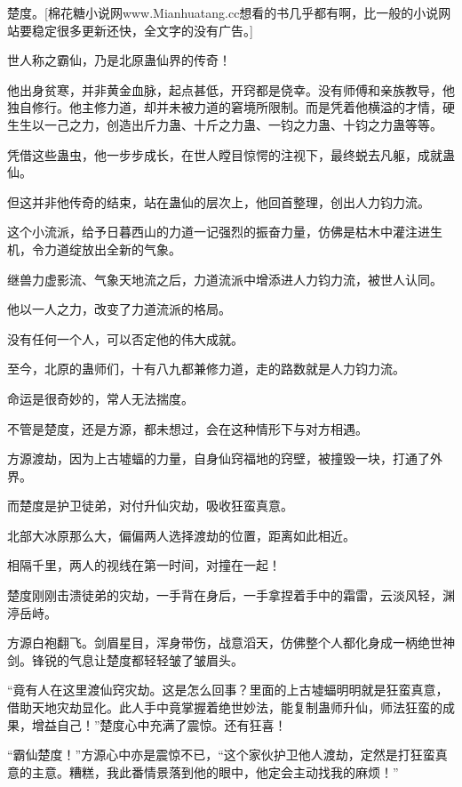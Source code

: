 
\begin{this_body}

楚度。[棉花糖小说网www.Mianhuatang.cc想看的书几乎都有啊，比一般的小说网站要稳定很多更新还快，全文字的没有广告。]

世人称之霸仙，乃是北原蛊仙界的传奇！

他出身贫寒，并非黄金血脉，起点甚低，开窍都是侥幸。没有师傅和亲族教导，他独自修行。他主修力道，却并未被力道的窘境所限制。而是凭着他横溢的才情，硬生生以一己之力，创造出斤力蛊、十斤之力蛊、一钧之力蛊、十钧之力蛊等等。

凭借这些蛊虫，他一步步成长，在世人瞠目惊愕的注视下，最终蜕去凡躯，成就蛊仙。

但这并非他传奇的结束，站在蛊仙的层次上，他回首整理，创出人力钧力流。

这个小流派，给予日暮西山的力道一记强烈的振奋力量，仿佛是枯木中灌注进生机，令力道绽放出全新的气象。

继兽力虚影流、气象天地流之后，力道流派中增添进人力钧力流，被世人认同。

他以一人之力，改变了力道流派的格局。

没有任何一个人，可以否定他的伟大成就。

至今，北原的蛊师们，十有八九都兼修力道，走的路数就是人力钧力流。

命运是很奇妙的，常人无法揣度。

不管是楚度，还是方源，都未想过，会在这种情形下与对方相遇。

方源渡劫，因为上古墟蝠的力量，自身仙窍福地的窍壁，被撞毁一块，打通了外界。

而楚度是护卫徒弟，对付升仙灾劫，吸收狂蛮真意。

北部大冰原那么大，偏偏两人选择渡劫的位置，距离如此相近。

相隔千里，两人的视线在第一时间，对撞在一起！

楚度刚刚击溃徒弟的灾劫，一手背在身后，一手拿捏着手中的霜雷，云淡风轻，渊渟岳峙。

方源白袍翻飞。剑眉星目，浑身带伤，战意滔天，仿佛整个人都化身成一柄绝世神剑。锋锐的气息让楚度都轻轻皱了皱眉头。

“竟有人在这里渡仙窍灾劫。这是怎么回事？里面的上古墟蝠明明就是狂蛮真意，借助天地灾劫显化。此人手中竟掌握着绝世妙法，能复制蛊师升仙，师法狂蛮的成果，增益自己！”楚度心中充满了震惊。还有狂喜！

“霸仙楚度！”方源心中亦是震惊不已，“这个家伙护卫他人渡劫，定然是打狂蛮真意的主意。糟糕，我此番情景落到他的眼中，他定会主动找我的麻烦！”


\end{this_body}
